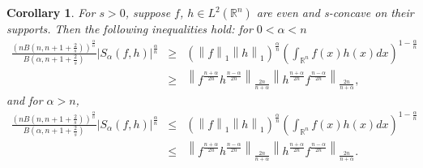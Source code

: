 \documentclass[preprint,12pt]{elsarticle}
\newtheorem{cor}{Corollary}
\begin{document}
\begin{cor}
For $s>0$, suppose $f$, $h\in L^{2}\left ( \mathbb{R}^n  \right )$ are even and s-concave on their supports. Then the following inequalities hold: for $0< \alpha < n$
\begin{eqnarray}\label{ee7.1}
	\frac{\left ( nB\left ( n,n+1+\frac{2}{s}  \right )  \right )^{\frac{\alpha }{n} }  }{B\left ( \alpha ,n+1+\frac{2}{s} \right ) } \left | S_{\alpha }\left ( f,h \right )   \right |^{\frac{\alpha }{n} } &\ge&  \left ( \left \| f \right \|_{1}\left \| h \right \|_{1}    \right )^{\frac{\alpha }{n} }\left ( \int_{\mathbb{R}^n }f\left ( x \right )h\left ( x \right )dx    \right )^{1-\frac{\alpha }{n} }\nonumber\\
	&\ge& {\left \| {f}^{\frac{n+\alpha }{2n}} {h}^{\frac{n-\alpha }{2n}}\right \|}_{\frac{2n }{n+\alpha}}{\left \| {h}^{\frac{n+\alpha }{2n}} {f}^{\frac{n-\alpha }{2n}}\right \|}_{\frac{2n }{n+\alpha}},
		\end{eqnarray}
	and for $\alpha >n $,
	\begin{eqnarray}\label{ee7.2}
		\frac{\left ( nB\left ( n,n+1+\frac{2}{s}  \right )  \right )^{\frac{\alpha }{n} }  }{B\left ( \alpha ,n+1+\frac{2}{s} \right ) } \left | S_{\alpha }\left ( f,h \right )   \right |^{\frac{\alpha }{n} } &\leq &  \left ( \left \| f \right \|_{1}\left \| h \right \|_{1}    \right )^{\frac{\alpha }{n} }\left ( \int_{\mathbb{R}^n }f\left ( x \right )h\left ( x \right )dx    \right )^{1-\frac{\alpha }{n} }\nonumber\\
		&\leq & {\left \| {f}^{\frac{n+\alpha }{2n}} {h}^{\frac{n-\alpha }{2n}}\right \|}_{\frac{2n }{n+\alpha}}{\left \| {h}^{\frac{n+\alpha }{2n}} {f}^{\frac{n-\alpha }{2n}}\right \|}_{\frac{2n }{n+\alpha}}.
	\end{eqnarray}
	\end{cor}
\end{document}

